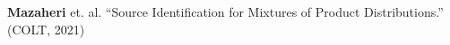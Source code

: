 \documentclass[preview]{standalone}
\begin{document}
\begin{center}
\textbf{Mazaheri} et. al. ``Source Identification for Mixtures of Product Distributions.'' (COLT, 2021)
\end{center}
\end{document}
